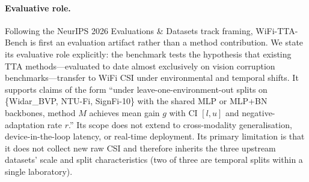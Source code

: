 \paragraph{Evaluative role.} Following the NeurIPS 2026 Evaluations \& Datasets track framing, WiFi-TTA-Bench is first an evaluation artifact rather than a method contribution. We state its evaluative role explicitly: the benchmark tests the hypothesis that existing TTA methods---evaluated to date almost exclusively on vision corruption benchmarks---transfer to WiFi CSI under environmental and temporal shifts. It supports claims of the form ``under leave-one-environment-out splits on \{Widar\_BVP, NTU-Fi, SignFi-10\} with the shared MLP or MLP+BN backbones, method $M$ achieves mean gain $g$ with CI $[l,u]$ and negative-adaptation rate $r$.'' Its scope does not extend to cross-modality generalisation, device-in-the-loop latency, or real-time deployment. Its primary limitation is that it does not collect new raw CSI and therefore inherits the three upstream datasets' scale and split characteristics (two of three are temporal splits within a single laboratory).

